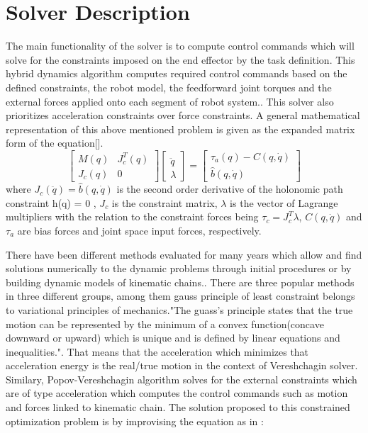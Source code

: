 \section{Solver Description}
The main functionality of the solver is to compute control commands which will solve for the constraints imposed on the end effector by the task definition. This hybrid dynamics algorithm computes required control commands based on the defined constraints, the robot model, the feedforward joint torques and the external forces applied onto each segment of robot system.\cite{vereshchagin1989modeling}. This solver also prioritizes acceleration constraints over force constraints.
A general mathematical representation of this above mentioned problem is given as the expanded matrix form of the equation[].\cite{}
$$\begin{bmatrix}
M(q) & J_{c}^{T}(q)\\
J_{c}(q) & 0
\end{bmatrix}
\begin{bmatrix}\\
\ddot{q} \\
\lambda
\end{bmatrix} = 
\begin{bmatrix}
\tau_{a}(q) - C(q,\dot{q}) \\ 
\hat{b}{(q,\dot{q})}
\end{bmatrix}$$
where $J_{c}(\ddot{q}) = \hat{b}(q,\dot{q})$ is the second order derivative of the holonomic path constraint h(q) = 0 , $J_{c}$ is the constraint matrix, $\lambda$ is the vector of Lagrange multipliers with the relation to the constraint forces being $\tau_{c} = J_{c}^{T}\lambda$, $C(q,\dot{q})$ and $\tau_{a}$ are bias forces and joint space input forces, respectively.\cite{featherstone2014rigid}
\par
There have been different methods evaluated for many years which allow and find solutions numerically to the dynamic problems through initial procedures or by building dynamic models of kinematic chains.\cite{vereshchagin1989modeling}. There are three popular methods in three different groups, among them gauss principle of least constraint belongs to variational principles of mechanics.\cite{vereshchagin1989modeling}"The guass's principle states that the true motion can be represented by the minimum of a convex function(concave downward or upward) which is unique and is defined by linear equations and inequalities."\cite{vereshchagin1989modeling}. That means that the acceleration which minimizes that acceleration energy is the real/true motion in the context of Vereshchagin solver. Similary, Popov-Vereshchagin algorithm solves for the external constraints which are of type acceleration which computes the control commands such as motion and forces linked to kinematic chain. The solution proposed to this constrained optimization problem is by improvising the equation as in \cite{vereshchagin1989modeling}\cite{shakhimardanov2015}:
